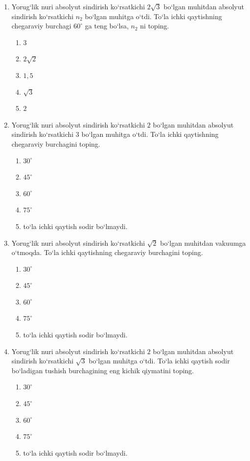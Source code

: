 \begin{enumerate}
\item Yorug‘lik nuri absolyut sindirish ko‘rsatkichi $2\sqrt{3}$ bo‘lgan muhitdan absolyut sindirish ko‘rsatkichi $n_2$ bo‘lgan muhitga o‘tdi. To‘la ichki qaytishning chegaraviy burchagi $60^\circ$ ga teng bo‘lsa, $n_2$ ni toping.
\begin{enumerate}[label=\Alph*)]
\item $3$
\item $2\sqrt{2}$
\item $1,5$
\item $\sqrt{3}$
\item $2$
\end{enumerate}

\item Yorug‘lik nuri absolyut sindirish ko‘rsatkichi $2$ bo‘lgan muhitdan absolyut sindirish ko‘rsatkichi $3$ bo‘lgan muhitga o‘tdi. To‘la ichki qaytishning chegaraviy burchagini toping.
\begin{enumerate}[label=\Alph*)]
\item $30^\circ$
\item $45^\circ$
\item $60^\circ$
\item $75^\circ$
\item to‘la ichki qaytish sodir bo‘lmaydi.
\end{enumerate}

\item Yorug‘lik nuri absolyut sindirish ko‘rsatkichi $\sqrt{2}$ bo‘lgan muhitdan vakuumga o‘tmoqda. To‘la ichki qaytishning chegaraviy burchagini toping.
\begin{enumerate}[label=\Alph*)]
\item $30^\circ$
\item $45^\circ$
\item $60^\circ$
\item $75^\circ$
\item to‘la ichki qaytish sodir bo‘lmaydi.
\end{enumerate}

\item Yorug‘lik nuri absolyut sindirish ko‘rsatkichi $2$ bo‘lgan muhitdan absolyut sindirish ko‘rsatkichi $\sqrt{3}$ bo‘lgan muhitga o‘tdi. To‘la ichki qaytish sodir bo‘ladigan tushish burchagining eng kichik qiymatini toping.
\begin{enumerate}[label=\Alph*)]
\item $30^\circ$
\item $45^\circ$
\item $60^\circ$
\item $75^\circ$
\item to‘la ichki qaytish sodir bo‘lmaydi.
\end{enumerate}


\end{enumerate}
